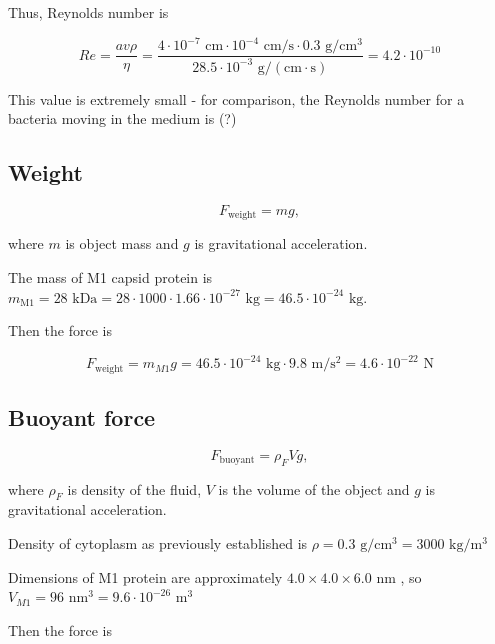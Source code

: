 Thus, Reynolds number is

\begin{equation}
Re = \frac{av\rho}{\eta} = \frac{4 \cdot 10^{-7} \text{ cm} \cdot 10^{-4} \text{ cm/s} \cdot 0.3 \text{ g}/\text{cm}^3}{28.5 \cdot 10^{-3} \text{ g}/(\text{cm} \cdot \text{s})} = 4.2 \cdot 10^{-10}
\end{equation}

This value is extremely small - for comparison, the Reynolds number for a bacteria moving in the medium is (?)

\subsection{Weight}

\begin{equation}
F_{\text{weight}} = mg,
\end{equation}

where $m$ is object mass and $g$ is gravitational acceleration.

The mass of M1 capsid protein is $m_{\text{M1}} = 28 \text{ kDa} = 28 \cdot 1000 \cdot 1.66 \cdot 10^{-27} \text{ kg} = 46.5 \cdot 10^{-24} \text{ kg}$. \cite{shtykova2013structural}

Then the force is

\begin{equation}
F_{\text{weight}} = m_{M1}g = 46.5 \cdot 10^{-24} \text{ kg} \cdot 9.8 \text{ m}/\text{s}^2 = 4.6 \cdot 10^{-22} \text{ N}
\end{equation}

\subsection{Buoyant force}

\begin{equation}
F_{\text{buoyant}} = \rho_FVg,
\end{equation}

where $\rho_F$ is density of the fluid, $V$ is the volume of the object and $g$ is gravitational acceleration.

Density of cytoplasm as previously established is $\rho = 0.3 \text{ g}/\text{cm}^3 = 3000 \text{ kg}/\text{m}^3$ \cite{hartmann1967cytoplasmic}

Dimensions of M1 protein are approximately $4.0 \times 4.0 \times 6.0 \text{ nm}$ \cite{shtykova2013structural}, so $V_{M1} = 96 \text{ nm}^3 = 9.6 \cdot 10^{-26} \text{ m}^3$

Then the force is


